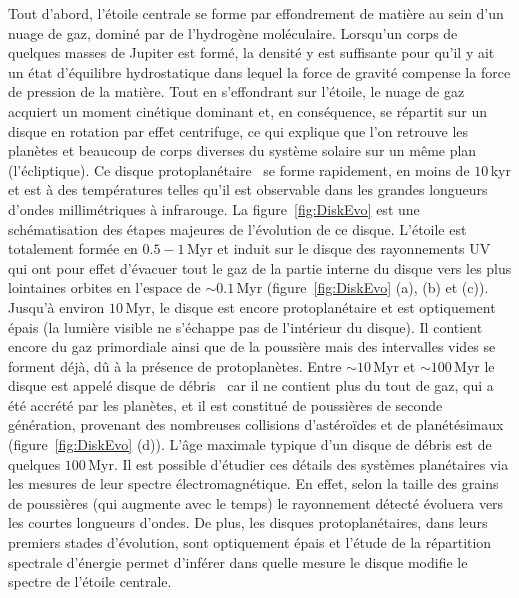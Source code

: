 Tout d'abord, l'étoile centrale se forme par effondrement de matière au sein d'un nuage de gaz, dominé par de l'hydrogène moléculaire. Lorsqu'un corps de quelques masses de Jupiter est formé, la densité y est suffisante pour qu'il y ait un état d'équilibre hydrostatique dans lequel la force de gravité compense la force de pression de la matière. Tout en s'effondrant sur l'étoile, le nuage de gaz acquiert un moment cinétique dominant et, en conséquence, se répartit sur un disque en rotation par effet centrifuge, ce qui explique que l'on retrouve les planètes et beaucoup de corps diverses du système solaire sur un même plan (l'écliptique). Ce disque protoplanétaire~\citep{williams2011} se forme rapidement, en moins de $10 \,$kyr et est à des températures telles qu'il est observable dans les grandes longueurs d'ondes millimétriques à infrarouge. La figure~\ref{fig:DiskEvo} est une schématisation des étapes majeures de l'évolution de ce disque. L'étoile est totalement formée en $0.5 - 1 \,$Myr et induit sur le disque des rayonnements \ac{UV} qui ont pour effet d'évacuer tout le gaz de la partie interne du disque vers les plus lointaines orbites en l'espace de $\sim 0.1 \,$Myr (figure~\ref{fig:DiskEvo} (a), (b) et (c)). Jusqu'à environ $10 \,$Myr, le disque est encore protoplanétaire et est optiquement épais (la lumière visible ne s'échappe pas de l'intérieur du disque). Il contient encore du gaz primordiale ainsi que de la poussière mais des intervalles vides se forment déjà, dû à la présence de protoplanètes. Entre $\sim 10 \,$Myr et $\sim 100 \,$Myr le disque est appelé disque de débris~\citep{wyatt2008} car il ne contient plus du tout de gaz, qui a été accrété par les planètes, et il est constitué de poussières de seconde génération, provenant des nombreuses collisions d'astéroïdes et de planétésimaux (figure~\ref{fig:DiskEvo} (d)). L'âge maximale typique d'un disque de débris est de quelques $100 \,$Myr. Il est possible d'étudier ces détails des systèmes planétaires via les mesures de leur spectre électromagnétique. En effet, selon la taille des grains de poussières (qui augmente avec le temps) le rayonnement détecté évoluera vers les courtes longueurs d'ondes. De plus, les disques protoplanétaires, dans leurs premiers stades d'évolution, sont optiquement épais et l'étude de la répartition spectrale d'énergie permet d'inférer dans quelle mesure le disque modifie le spectre de l'étoile centrale.

